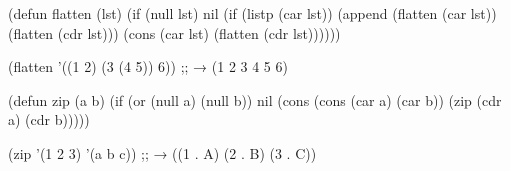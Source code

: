 \begin{examplebox}[title=Aplanamiento recursivo]
\begin{lispcode}
(defun flatten (lst)
  (if (null lst)
      nil
      (if (listp (car lst))
          (append (flatten (car lst))
                  (flatten (cdr lst)))
          (cons (car lst) (flatten (cdr lst))))))

(flatten '((1 2) (3 (4 5)) 6))  ;; → (1 2 3 4 5 6)
\end{lispcode}
\end{examplebox}

\begin{examplebox}[title=Zip de dos listas]
\begin{lispcode}
(defun zip (a b)
  (if (or (null a) (null b))
      nil
      (cons (cons (car a) (car b))
            (zip (cdr a) (cdr b)))))

(zip '(1 2 3) '(a b c))  ;; → ((1 . A) (2 . B) (3 . C))
\end{lispcode}
\end{examplebox}

